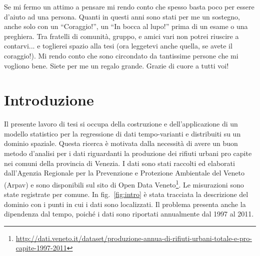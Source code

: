 \documentclass[a4paper,11pt,twoside,openright]{book}							%
\begin{document}
Se mi fermo un attimo a pensare mi rendo conto che spesso basta poco per essere d’aiuto ad una persona. Quanti in questi anni sono stati per me un sostegno, anche solo con un “Coraggio!”, un “In bocca al lupo!” prima di un esame o una preghiera. Tra fratelli di comunità, gruppo, e amici vari non potrei riuscire a contarvi... e toglierei spazio alla tesi (ora leggetevi anche quella, se avete il coraggio!). Mi rendo conto che sono circondato da tantissime persone che mi vogliono bene. Siete per me un regalo grande. Grazie di cuore a tutti voi! 

\thispagestyle{empty}

\frontmatter
\tableofcontents
{}
\listoffigures
{}
\listoftables
{}
\newpage
\thispagestyle{empty}
\mainmatter

\chapter*{Introduzione}
\label{Cap:intro}
\thispagestyle{empty}

Il presente lavoro di tesi si occupa della costruzione e dell'applicazione di un modello statistico per la regressione di dati tempo-varianti e distribuiti su un dominio spaziale. Questa ricerca è motivata dalla necessità di avere un buon metodo d'analisi per i dati riguardanti la produzione dei rifiuti urbani pro capite nei comuni della provincia di Venezia. I dati sono stati raccolti ed elaborati dall'Agenzia Regionale per la Prevenzione e Protezione Ambientale del Veneto (Arpav) e sono disponibili sul sito di Open Data Veneto\footnote{\href{http://dati.veneto.it/dataset/produzione-annua-di-rifiuti-urbani-totale-e-pro-capite-1997-2011}{http://dati.veneto.it/dataset/produzione-annua-di-rifiuti-urbani-totale-e-pro-capite-1997-2011}}. Le misurazioni sono state registrate per comune. In fig.~\ref{fig:intro} è stata tracciata la descrizione del dominio con i punti in cui i dati sono localizzati. Il problema presenta anche la dipendenza dal tempo, poiché i dati sono riportati annualmente dal 1997 al 2011.
\end{document}
